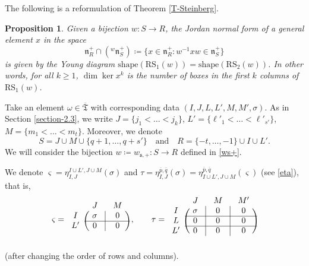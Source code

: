 \documentclass[11pt]{article}
\newtheorem{prop}[theo]{Proposition}
\theoremstyle{definition}
\numberwithin{equation}{section}
\newcommand{\fs}{\mathfrak{s}}
\newcommand{\fn}{\mathfrak{n}}
\newcommand{\RS}{\mathrm{RS}}
\newcommand{\shape}{\mathrm{shape}}
\newcommand{\Mat}{\mathrm{M}}
\newcommand{\intp}{\overline{p}}
\newcommand{\intq}{\overline{q}}
\newcommand{\ppermutationsof}{\mathfrak{T}}
\newcommand{\parameters}{\overline{\ppermutationsof}}
\newcommand{\mC}{\mathbb{C}}
\begin{document}
The following is a reformulation of Theorem \ref{T-Steinberg}.

\begin{prop}
\label{P4.6}
Given a bijection $w: S\to R$, the Jordan normal form of a general element $x$ in the space
\[
\fn_R^+\cap({}^w\fn_S^+)\coloneqq \{x\in\fn_R^+:w^{-1}xw\in\fn_S^+\}
\]
is given by the Young diagram $\shape(\RS_1(w))=\shape(\RS_2(w))$. In other words, for all $k\geq 1$, $\dim \ker x^k$ is the number of boxes in the first $k$ columns of $\RS_1(w)$.\end{prop}

Take an element $\omega\in\parameters$ with corresponding data $(I,J,L,L',M,M',\sigma)$. As in Section \ref{section-2.3}, we write $J=\{j_1<\ldots<j_k\}$, $L'=\{\ell'_1<\ldots<\ell'_{s'}\}$, $M=\{m_1<\ldots<m_t\}$.
Moreover, we denote
\[
S=J\cup M\cup \{q+1,\ldots,q+s'\}\quad\mbox{and}\quad
 R=\{-t,\ldots,-1\}\cup I\cup L'.
\]
We will consider the bijection $w\coloneqq w_{\fs,+}:S\to R$ defined in \eqref{ws+}.


We denote $\varsigma=\eta_{I,J}^{I\cup L',J\cup M}(\sigma)$ and $\tau=\eta_{I,J}^{\intp,\intq}(\sigma)=\eta_{I\cup L',J\cup M}^{\intp,\intq}(\varsigma)$ (see \eqref{eta}), that is,
\begin{equation}
\label{zeta-tau}
\varsigma=\begin{blockarray}{ccc}
{} & {\ J\ } & {\ M\ }\\
\begin{block}{c(c|c)}
I & \sigma & 0\\
\cline{2-3}
L' & 0 & 0\\
\end{block}
\end{blockarray}\,,\qquad \tau=\begin{blockarray}{cccc}
{} & {\ J\ } & {\ M\ } & {\ M'\ }\\
\begin{block}{c(c|c|c)}
I & \sigma & 0 & 0\\
\cline{2-4}
L & 0 & 0 & 0\\
\cline{2-4}
L' & 0 & 0 & 0\\
\end{block}
\end{blockarray}
\end{equation}
(after changing the order of rows and columns).
\end{document}
